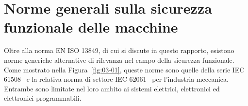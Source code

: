\chapter{Norme generali sulla sicurezza funzionale delle macchine}
\label{cap:03}

Oltre alla norma EN ISO 13849, di cui si discute in questo rapporto, esistono norme generiche alternative di rilevanza nel campo della sicurezza funzionale. Come mostrato nella Figura~\ref{fig:03-01}, queste norme sono quelle della serie IEC 61508~\cite{iec61508} e la relativa norma di settore IEC 62061~\cite{iec62061} per l'industria meccanica. Entrambe sono limitate nel loro ambito ai sistemi elettrici, elettronici ed elettronici programmabili.
\begin{center}
    \begin{minipage}{\textwidth}
        \centering
        \captionsetup{hypcap=false}
        \resizebox{0.92\textwidth}{!}{}
        \label{fig:03-01}
    \end{minipage}
\end{center}

